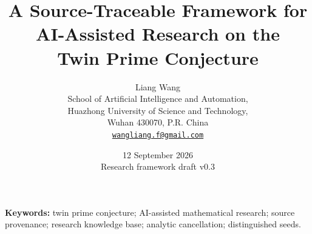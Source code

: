 \documentclass[11pt,a4paper]{article}
\title{A Source-Traceable Framework for\\
AI-Assisted Research on the\\Twin Prime Conjecture}
\author{Liang Wang\\[0.4em]
\small School of Artificial Intelligence and Automation,\\
\small Huazhong University of Science and Technology,\\
\small Wuhan 430070, P.R. China\\
\small\href{mailto:wangliang.f@gmail.com}{\texttt{wangliang.f@gmail.com}}}
\date{12 September 2026\\Research framework draft v0.3}
\theoremstyle{definition}
\theoremstyle{remark}
\begin{document}
\pagestyle{plain}
\maketitle
\begin{abstract}

\end{abstract}
\noindent\textbf{Keywords:} twin prime conjecture; AI-assisted mathematical research; source provenance; research knowledge base; analytic cancellation; distinguished seeds.
\clearpage
\setcounter{tocdepth}{1}
\tableofcontents
\medskip

\clearpage












\clearpage
\appendix


\clearpage
{}
{}
\begingroup\raggedright


\endgroup
\end{document}
